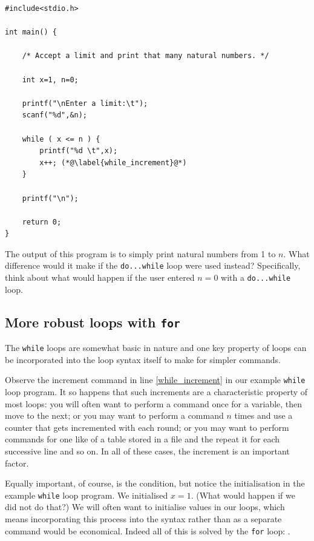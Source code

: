 \documentclass[11pt,oneside]{article}
\begin{document}
{{{{{{{{{\begin{lstlisting}
#include<stdio.h>

int main() {
    
    /* Accept a limit and print that many natural numbers. */
    
    int x=1, n=0;
    
    printf("\nEnter a limit:\t");
    scanf("%d",&n);
    
    while ( x <= n ) {
        printf("%d \t",x);
        x++; (*@\label{while_increment}@*)
    }
    
    printf("\n");
    
    return 0;
}
\end{lstlisting}

The output of this program is to simply print natural numbers from 1 to $n$. What difference would it make if the \verb+do...while+ loop were used instead? Specifically, think about what would happen if the user entered $n = 0$ with a \verb+do...while+ loop.

\subsection{More robust loops with \texttt{\large \lowercase{for}}}

The \verb+while+ loops are somewhat basic in nature and one key property of loops can be incorporated into the loop syntax itself to make for simpler commands.

Observe the increment command in line \ref{while_increment} in our example \verb+while+ loop program. It so happens that such increments are a characteristic property of most loops: you will often want to perform a command once for a variable, then move to the next; or you may want to perform a command $n$ times and use a counter that gets incremented with each round; or you may want to perform commands for one like of a table stored in a file and the repeat it for each successive line and so on. In all of these cases, the increment is an important factor.

Equally important, of course, is the condition, but notice the initialisation in the example \verb+while+ loop program. We initialised $x=1$. (What would happen if we did not do that?) We will often want to initialise values in our loops, which means incorporating this process into the syntax rather than as a separate command would be economical. Indeed all of this is solved by the \verb+for+ loop: .

}}}}}}}}}
\end{document}
